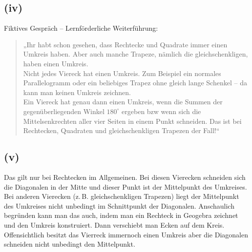\documentclass[12pt,a4paper]{article}
\begin{document}
\subsection*{(iv)}
Fiktives Gespräch – Lernförderliche Weiterführung:
\begin{quote}
    „Ihr habt schon gesehen, dass Rechtecke und Quadrate immer einen Umkreis haben. Aber auch manche Trapeze, nämlich die gleichschenkligen, haben einen Umkreis.\\
    Nicht jedes Viereck hat einen Umkreis. Zum Beispiel ein normales Parallelogramm oder ein beliebiges Trapez ohne gleich lange Schenkel – da kann man keinen Umkreis zeichnen.\\
Ein Viereck hat genau dann einen Umkreis, wenn die Summen der gegenüberliegenden Winkel $180^\circ$ ergeben bzw wenn sich die Mittelsenkrechten aller vier Seiten in einem Punkt schneiden. Das ist bei Rechtecken, Quadraten und gleichschenkligen Trapezen der Fall!“
\end{quote}     

\subsection*{(v)}
Das gilt nur bei Rechtecken im Allgemeinen. Bei diesen Vierecken schneiden sich die Diagonalen in der Mitte und dieser Punkt ist der Mittelpunkt des Umkreises. Bei anderen Vierecken (z.\,B. gleichschenkligen Trapezen) liegt der Mittelpunkt des Umkreises nicht unbedingt im Schnittpunkt der Diagonalen. Anschaulich begründen kann man das auch, indem man ein Rechteck in Geogebra zeichnet und den Umkreis konstruiert. Dann verschiebt man Ecken auf dem Kreis. Offensichtlich besitzt das Vierreck immernoch einen Umkreis aber die Diagonalen schneiden nicht unbedingt den Mittelpunkt.
\end{document}
